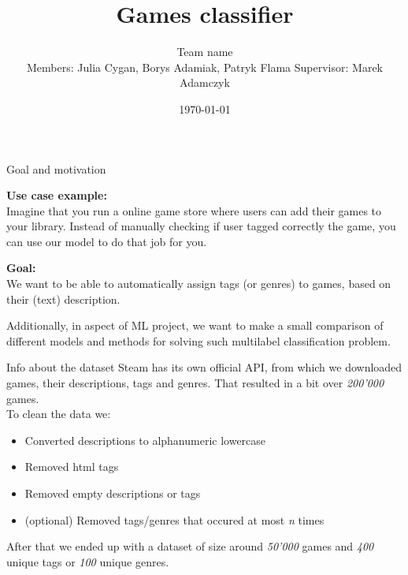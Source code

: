 \documentclass{beamer}
\title{Games classifier}
\author[Team name]{Team name\\[5mm]
{\small Members: Julia Cygan, Borys Adamiak, Patryk Flama}
\hspace{18mm} 
{\small Supervisor: Marek Adamczyk}}
\institute{UWr}
\date{\today}
\begin{document}
\begin{frame}
\titlepage
\end{frame}


\begin{frame}[t]{Goal and motivation}

{\bf Use case example:} \\
Imagine that you run a online game store where users can add their games to your library. Instead of manually checking if user tagged correctly the game, you can use our model to do that job for you. \\

\vspace{3mm}

{\bf Goal:} \\
We want to be able to automatically assign tags (or genres) to games, based on their (text) description.

\vspace{3mm}

Additionally, in aspect of ML project, we want to make a small comparison of different models and methods for solving such multilabel classification problem.
\end{frame}

\begin{frame}[t]{Info about the dataset}
Steam has its own official API, from which we downloaded games, their descriptions, tags and genres. That resulted in a bit over {\it 200'000} games. \\
\vspace{2mm}
To clean the data we:
\begin{itemize}
	\item Converted descriptions to alphanumeric lowercase
	\item Removed html tags
	\item Removed empty descriptions or tags
	\item (optional) Removed tags/genres that occured at most {\it n} times
\end{itemize}
After that we ended up with a dataset of size around {\it 50'000} games and {\it 400} unique tags or {\it 100} unique genres.

\end{frame}
\end{document}
